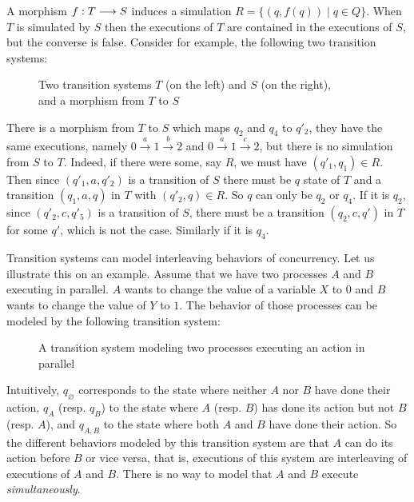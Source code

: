	A morphism $f : T \longrightarrow S$ induces a simulation $R = \{(q,f(q)) \mid q \in Q\}$. When $T$ is simulated by $S$ then the executions of $T$ are contained in the executions of $S$, but the converse is false. Consider for example, the following two transition systems:
	
	
	\begin{figure}[H]
		\begin{center}
    			
  		\end{center}
  		\caption{Two transition systems $T$ (on the left) and $S$ (on the right),\\and a morphism from $T$ to $S$}
	\end{figure}


	There is a morphism from $T$ to $S$ which maps $q_2$ and $q_4$ to $q'_2$, they have the same executions, namely $0 \xrightarrow{~a~} 1 \xrightarrow{~b~} 2$ and $0 \xrightarrow{~a~} 1 \xrightarrow{~c~} 2$, but there is no simulation from $S$ to $T$. Indeed, if there were some, say $R$, we must have $(q'_1,q_1) \in R$. Then since $(q'_1,a,q'_2)$ is a transition of $S$ there must be $q$ state of $T$ and a transition $(q_1,a,q)$ in $T$ with $(q'_2,q) \in R$. So $q$ can only be $q_2$ or $q_4$. If it is $q_2$, since $(q'_2,c,q'_5)$ is a transition of $S$, there must be a transition $(q_2,c,q')$ in $T$ for some $q'$, which is not the case. Similarly if it is $q_4$.
	
	Transition systems can model interleaving behaviors of concurrency. Let us illustrate this on an example. Assume that we have two processes $A$ and $B$ executing in parallel. $A$ wants to change the value of a variable $X$ to $0$ and $B$ wants to change the value of $Y$ to $1$. The behavior of those processes can be modeled by the following transition system:
	
	
	\begin{figure}[!htbp]
		\begin{center}
    			
  		\end{center}
  		\caption{A transition system modeling two processes executing an action in parallel}
  		\label{fig:jolieImage}
	\end{figure}
	
	Intuitively, $q_\varnothing$ corresponds to the state where neither $A$ nor $B$ have done their action, $q_A$ (resp. $q_B$) to the state where $A$ (resp. $B$) has done its action but not $B$ (resp. $A$), and $q_{A,B}$ to the state where both $A$ and $B$ have done their action. So the different behaviors modeled by this transition system are that $A$ can do its action before $B$ or vice versa, that is, executions of this system are interleaving of executions of $A$ and $B$. There is no way to model that $A$ and $B$ execute \emph{simultaneously}.
	
